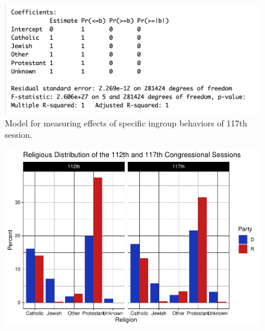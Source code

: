 \documentclass[Royal,times,sageh]{sagej}
\begin{document}
\begin{figure}

{\centering \includegraphics[width=0.7\linewidth]{images/117th_religion} 

}

\caption{Model for measuring effects of specific ingroup behaviors of 117th session.\label{table4}}\label{fig:table4}
\end{figure}

\begin{figure}
\includegraphics[width=1\linewidth]{final_reprorrt_files/figure-latex/plot-ref-1} \caption{\label{fig:plot}}\label{fig:plot-ref}
\end{figure}



\end{document}
